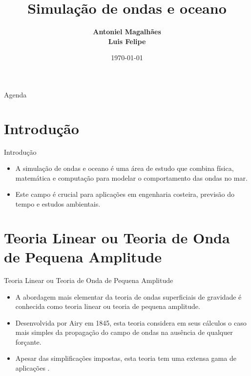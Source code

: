 \documentclass[aspectratio=169,xcolor=table]{beamer}
\author[Magalhães, Felipe]{%
  \textbf{Antoniel Magalhães} \\
  \textbf{Luis Felipe}
}
\title{Simulação de ondas e oceano}
\institute{Universidade Federal da Bahia \\ Instituto de Computação}
\date{\today}
\begin{document}
\begin{frame}
    \titlepage
\end{frame}

\begin{frame}{Agenda}
    \tableofcontents
\end{frame}

\setlength{\parskip}{1em} %

\section{Introdução}
\begin{frame}{Introdução}
    \begin{itemize}
        \item A simulação de ondas e oceano é uma área de estudo que combina física, matemática e computação para modelar o comportamento das ondas no mar.
        \item Este campo é crucial para aplicações em engenharia costeira, previsão do tempo e estudos ambientais.
    \end{itemize}
\end{frame}

\section{Teoria Linear ou Teoria de Onda de Pequena Amplitude}
\begin{frame}{Teoria Linear ou Teoria de Onda de Pequena Amplitude}
    \begin{itemize}
        \item A abordagem mais elementar da teoria de ondas superficiais de gravidade é conhecida como teoria linear ou teoria de pequena amplitude.
        \item Desenvolvida por Airy em 1845, esta teoria considera em seus cálculos o caso mais simples da propagação do campo de ondas na ausência de qualquer forçante.
        \item Apesar das simplificações impostas, esta teoria tem uma extensa gama de aplicações \cite{meirelles2007modelagem}.
    \end{itemize}
\end{frame}
\end{document}
